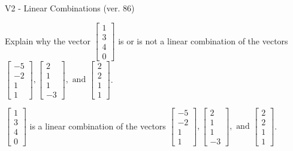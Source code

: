 \begin{exercise}
  \begin{exerciseTitle}V2 - Linear Combinations (ver. 86)\end{exerciseTitle}
  \begin{exerciseStatement}
    Explain why the vector \(\left[\begin{array}{c}
1 \\
3 \\
4 \\
0
\end{array}\right]\)  is or is not a linear 
	combination of the vectors \(\left[\begin{array}{c}
-5 \\
-2 \\
1 \\
1
\end{array}\right] , \left[\begin{array}{c}
2 \\
1 \\
1 \\
-3
\end{array}\right] , \text{ and } \left[\begin{array}{c}
2 \\
2 \\
1 \\
1
\end{array}\right]\).
	


  \end{exerciseStatement}
  \begin{exerciseAnswer}
   \(\left[\begin{array}{c}
1 \\
3 \\
4 \\
0
\end{array}\right]\) 
  	 is  
	a linear combination of the vectors \(\left[\begin{array}{c}
-5 \\
-2 \\
1 \\
1
\end{array}\right] , \left[\begin{array}{c}
2 \\
1 \\
1 \\
-3
\end{array}\right] , \text{ and } \left[\begin{array}{c}
2 \\
2 \\
1 \\
1
\end{array}\right]\).

	
  


  \end{exerciseAnswer}
\end{exercise}